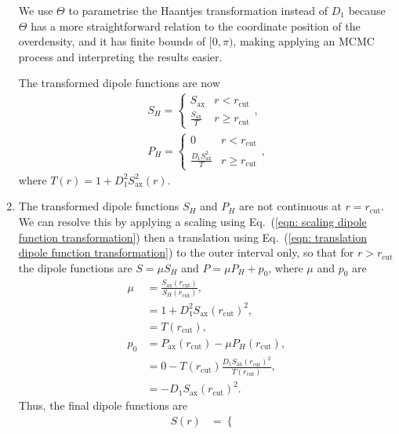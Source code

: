 \documentclass[a4paper,12pt]{report}
\renewcommand{\eqref}[1]{Eq.~({#1})}
\begin{document}
\begin{enumerate}
    We use $\Theta$ to parametrise the Haantjes transformation instead of $D_1$ because $\Theta$ has a more straightforward relation to the coordinate position of the overdensity, and it has finite bounds of $[0,\pi)$, making applying an MCMC process and interpreting the results easier.

    The transformed dipole functions are now
    \begin{align}
        S_H =
        \begin{cases}
            S_{\text{ax}} & r<r_{\text{cut}} \\
            \frac{S_{\text{ax}}}{T} & r \geq r_{\text{cut}}
        \end{cases}, \\
        P_H =
        \begin{cases}
            0 & r<r_{\text{cut}} \\
            \frac{D_1 S_{\text{ax}}^2}{T} & r \geq r_{\text{cut}}
        \end{cases},
    \end{align}
    where $T(r) = 1 + D_1^2 S_\text{ax}^2 (r)$.
    \item The transformed dipole functions $S_H$ and $P_H$ are not continuous at $r=r_\text{cut}$. We can resolve this by applying a scaling using \eqref{\ref{eqn: scaling dipole function transformation}} then a translation using \eqref{\ref{eqn: translation dipole function transformation}} to the outer interval only, so that for $r > r_\text{cut}$ the dipole functions are $S = \mu S_H$ and $P = \mu P_H + p_0$, where $\mu$ and $p_0$ are
    \begin{align}
        \mu &= \frac{S_{\text{ax}}(r_{\text{cut}})}{S_H(r_{\text{cut}})}, \\
        &= 1+D_1^2 S_{\text{ax}}(r_\text{cut})^2, \\
        &= T(r_\text{cut}), \\
        p_0 &= P_{\text{ax}}(r_{\text{cut}}) - \mu P_H(r_{\text{cut}}), \\
        &= 0 - T(r_\text{cut}) \frac{D_1 S_{\text{ax}}(r_{\text{cut}})^2}{T(r_\text{cut})}, \\
        &= -D_1 S_{\text{ax}}(r_{\text{cut}})^2.
    \end{align}
    Thus, the final dipole functions are
    \begin{subequations}
    \begin{align} \label{eqn: two structures transformed dipoles}
        S(r) &=
        \begin{cases}

\end{cases}
\end{align}
\end{subequations}
\end{enumerate}
\end{document}
